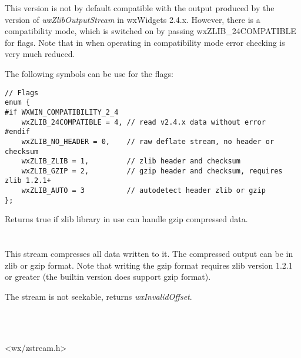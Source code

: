 This version is not by default compatible with the output produced by
the version of {\it wxZlibOutputStream} in wxWidgets 2.4.x. However,
there is a compatibility mode, which is switched on by passing
wxZLIB\_24COMPATIBLE for flags. Note that in when operating in compatibility
mode error checking is very much reduced.

The following symbols can be use for the flags:

\begin{verbatim}
// Flags
enum {
#if WXWIN_COMPATIBILITY_2_4
    wxZLIB_24COMPATIBLE = 4, // read v2.4.x data without error
#endif
    wxZLIB_NO_HEADER = 0,    // raw deflate stream, no header or checksum
    wxZLIB_ZLIB = 1,         // zlib header and checksum
    wxZLIB_GZIP = 2,         // gzip header and checksum, requires zlib 1.2.1+
    wxZLIB_AUTO = 3          // autodetect header zlib or gzip
};
\end{verbatim}

\label{wxzlibinputstreamcanhandlegzip}


Returns true if zlib library in use can handle gzip compressed data.

\section{}\label{wxzliboutputstream}

This stream compresses all data written to it. The compressed output can be
in zlib or gzip format.
Note that writing the gzip format requires zlib version 1.2.1 or greater
(the builtin version does support gzip format).

The stream is not seekable,  returns
 {\it wxInvalidOffset}.


\\
\\


<wx/zstream.h>

